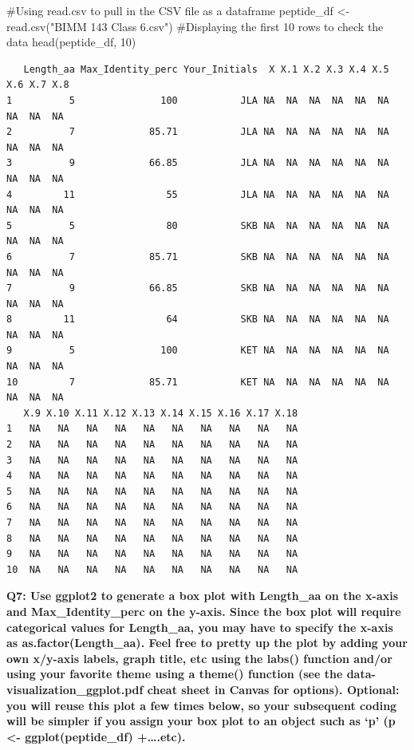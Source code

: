 \documentclass[
  letterpaper,
  DIV=11,
  numbers=noendperiod]{scrartcl}
\newenvironment{Shaded}{\begin{snugshade}}{\end{snugshade}}
\newcommand{\CommentTok}[1]{\textcolor[rgb]{0.37,0.37,0.37}{#1}}
\newcommand{\DecValTok}[1]{\textcolor[rgb]{0.68,0.00,0.00}{#1}}
\newcommand{\FunctionTok}[1]{\textcolor[rgb]{0.28,0.35,0.67}{#1}}
\newcommand{\NormalTok}[1]{\textcolor[rgb]{0.00,0.23,0.31}{#1}}
\newcommand{\OtherTok}[1]{\textcolor[rgb]{0.00,0.23,0.31}{#1}}
\newcommand{\StringTok}[1]{\textcolor[rgb]{0.13,0.47,0.30}{#1}}
\begin{document}
\begin{Shaded}
\begin{Highlighting}[]
\CommentTok{\#Using read.csv to pull in the CSV file as a dataframe}
\NormalTok{peptide\_df }\OtherTok{\textless{}{-}} \FunctionTok{read.csv}\NormalTok{(}\StringTok{"BIMM 143 Class 6.csv"}\NormalTok{)}
\CommentTok{\#Displaying the first 10 rows to check the data}
\FunctionTok{head}\NormalTok{(peptide\_df, }\DecValTok{10}\NormalTok{)}
\end{Highlighting}
\end{Shaded}

\begin{verbatim}
   Length_aa Max_Identity_perc Your_Initials  X X.1 X.2 X.3 X.4 X.5 X.6 X.7 X.8
1          5               100           JLA NA  NA  NA  NA  NA  NA  NA  NA  NA
2          7             85.71           JLA NA  NA  NA  NA  NA  NA  NA  NA  NA
3          9             66.85           JLA NA  NA  NA  NA  NA  NA  NA  NA  NA
4         11                55           JLA NA  NA  NA  NA  NA  NA  NA  NA  NA
5          5                80           SKB NA  NA  NA  NA  NA  NA  NA  NA  NA
6          7             85.71           SKB NA  NA  NA  NA  NA  NA  NA  NA  NA
7          9             66.85           SKB NA  NA  NA  NA  NA  NA  NA  NA  NA
8         11                64           SKB NA  NA  NA  NA  NA  NA  NA  NA  NA
9          5               100           KET NA  NA  NA  NA  NA  NA  NA  NA  NA
10         7             85.71           KET NA  NA  NA  NA  NA  NA  NA  NA  NA
   X.9 X.10 X.11 X.12 X.13 X.14 X.15 X.16 X.17 X.18
1   NA   NA   NA   NA   NA   NA   NA   NA   NA   NA
2   NA   NA   NA   NA   NA   NA   NA   NA   NA   NA
3   NA   NA   NA   NA   NA   NA   NA   NA   NA   NA
4   NA   NA   NA   NA   NA   NA   NA   NA   NA   NA
5   NA   NA   NA   NA   NA   NA   NA   NA   NA   NA
6   NA   NA   NA   NA   NA   NA   NA   NA   NA   NA
7   NA   NA   NA   NA   NA   NA   NA   NA   NA   NA
8   NA   NA   NA   NA   NA   NA   NA   NA   NA   NA
9   NA   NA   NA   NA   NA   NA   NA   NA   NA   NA
10  NA   NA   NA   NA   NA   NA   NA   NA   NA   NA
\end{verbatim}

\textbf{Q7: Use ggplot2 to generate a box plot with Length\_aa on the
x-axis and Max\_Identity\_perc on the y-axis. Since the box plot will
require categorical values for Length\_aa, you may have to specify the
x-axis as as.factor(Length\_aa). Feel free to pretty up the plot by
adding your own x/y-axis labels, graph title, etc using the labs()
function and/or using your favorite theme using a theme() function (see
the data-visualization\_ggplot.pdf cheat sheet in Canvas for options).
Optional: you will reuse this plot a few times below, so your subsequent
coding will be simpler if you assign your box plot to an object such as
`p' (p \textless- ggplot(peptide\_df) +\ldots.etc).}
\end{document}
